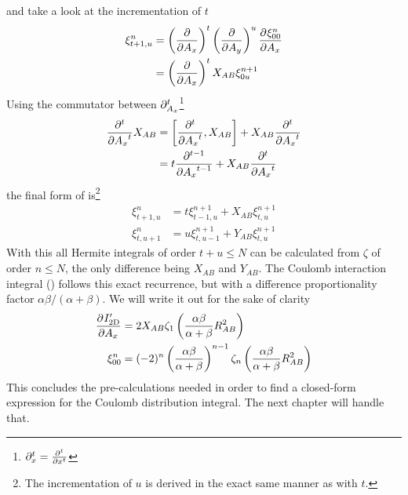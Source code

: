     and take a look at the incrementation of $t$
        \begin{align}
            \xi^n_{t+1,u} &= \prdp{A_x}{t}\prdp{A_y}{u} \prd{A_x}[\xi^n_{00}]
            \nonumber \\
            &= \prdp{A_x}{t}X_{AB}\xi^{n+1}_{0u}
            \label{eq:Rtincr}
        \end{align}
    Using the commutator between
    $\mathrm{\partial}^t_{A_x}$\footnote{$\prtl^t_x=\prd{x}[][t]$}
        \begin{align}
            \prd{A_x}[][t] X_{AB} &= \left[\prd{A_x}[][t], X_{AB}\right] +
            X_{AB}\prd{A_x}[][t] \nonumber \\
            &= t\prd{A_x}[][t-1] + X_{AB}\prd{A_x}[][t]
        \end{align}
    the final form of  is\footnote{The incrementation of $u$ is
    derived in the exact same manner as with $t$.}
        \begin{equation}
            \begin{aligned}
                \xi^n_{t+1,u} &= t\xi^{n+1}_{t-1,u} + X_{AB}\xi^{n+1}_{t,u} \\
                \xi^n_{t,u+1} &= u\xi^{n+1}_{t,u-1} + Y_{AB}\xi^{n+1}_{t,u}
            \end{aligned}
        \end{equation}
    With this all Hermite integrals of order $t+u\leq N$ can be calculated from
    $\zeta$ of order $n\leq N$, the only difference being $X_{AB}$ and
    $Y_{AB}$. The Coulomb interaction integral
    () follows this exact recurrence, but
    with a difference proportionality factor $\alpha\beta/(\alpha+\beta)$. We
    will write it out for the sake of clarity
        \begin{equation}
            \begin{aligned}
                \prd{A_x}[I'_{\text{2D}}] &=
                2X_{AB}\zeta_1\left(\frac{\alpha\beta}{\alpha+\beta}R^2_{AB}\right) \\
                \xi^n_{00} &=
                (-2)^n\left(\frac{\alpha\beta}{\alpha+\beta}\right)^{n-1}
                \zeta_n\left(\frac{\alpha\beta}{\alpha+\beta}
                R^2_{AB}\right)
            \end{aligned}
        \end{equation}
    This concludes the pre-calculations needed in order to find a closed-form
    expression for the Coulomb distribution integral. The next chapter will
    handle that.

